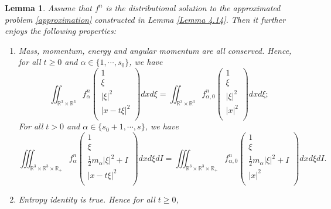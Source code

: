 \documentclass[reqno,11pt]{amsart}
\newtheorem{lemma}{Lemma}[section]
\numberwithin{equation}{section}
\def\R{\mathbb{R}}
\begin{document}
\begin{lemma}\label{Lemma 4.17}
Assume that $f^n$ is the distributional solution to the approximated problem \eqref{approximation} constructed in Lemma \ref{Lemma 4.14}. Then it further enjoys the following properties:
\begin{enumerate}
	\item {Mass, momentum, energy and angular momentum are all conserved. Hence, for all $t \geq 0$ and $\alpha \in \{1,\cdots,s_0\}$, we have
		\begin{equation*}
			\iint_{\R^3 \times \R^3 } f^n_\alpha 
			\left (\begin{array}{c}
				1 \\[2mm]
				\xi \\ [2mm]
				|\xi|^2 \\ [2mm]
				|x-t\xi|^2 \\[2mm]
			\end{array}\right ) dxd\xi 
			= \iint_{\R^3 \times \R^3 } f_{\alpha ,0}^n 
			\left (\begin{array}{c}
				1 \\[2mm]
				\xi \\ [2mm]
				|\xi|^2 \\ [2mm]
				|x|^2 \\[2mm]
			\end{array}\right )dxd\xi ;
	\end{equation*}
For all $t>0$ and $\alpha \in \{s_0+1,\cdots,s\}$, we have
\begin{equation*}
	\iiint_{\R^3 \times \R^3 \times \R_+ } f^n_\alpha 
	\left (\begin{array}{c}
		1 \\[2mm]
		\xi \\ [2mm]
		\frac{1}{2}m_\alpha|\xi|^2+I \\ [2mm]
		|x-t\xi|^2 \\[2mm]
	\end{array}\right ) dxd\xi dI 
	= \iiint_{\R^3 \times \R^3 \times \R_+ } f_{\alpha ,0}^n 
	\left (\begin{array}{c}
		1 \\[2mm]
		\xi \\ [2mm]
		\frac{1}{2}m_\alpha|\xi|^2+I\\ [2mm]
		|x|^2 \\[2mm]
	\end{array}\right )dxd\xi dI .
	\end{equation*}}\label{1 of Lemma 4.17}
	\item{Entropy identity is true. Hence for all $t \geq 0$,
}
\end{enumerate}
\end{lemma}
\end{document}
